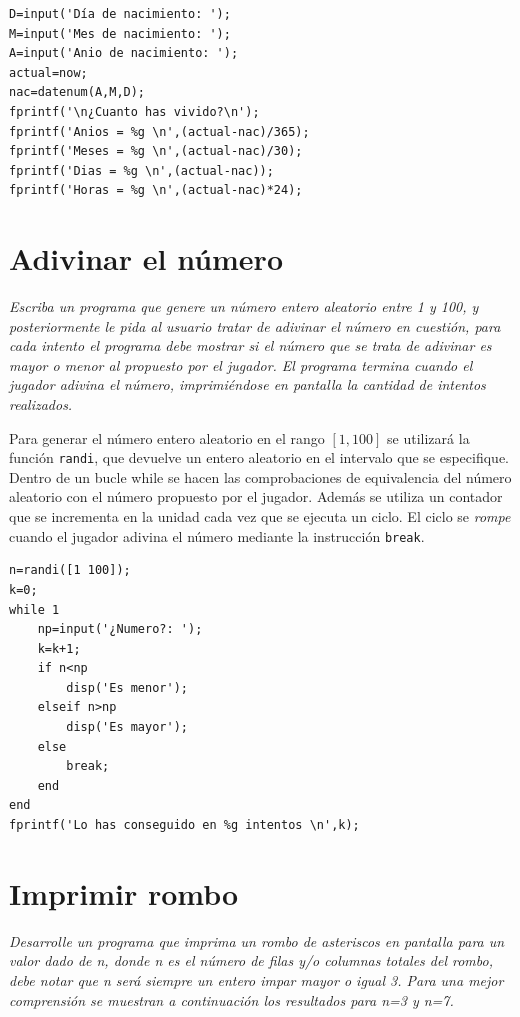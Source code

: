 \begin{verbatim}
D=input('Día de nacimiento: ');
M=input('Mes de nacimiento: ');
A=input('Anio de nacimiento: ');
actual=now;
nac=datenum(A,M,D);
fprintf('\n¿Cuanto has vivido?\n');
fprintf('Anios = %g \n',(actual-nac)/365);
fprintf('Meses = %g \n',(actual-nac)/30);
fprintf('Dias = %g \n',(actual-nac));
fprintf('Horas = %g \n',(actual-nac)*24);
\end{verbatim}


\section{Adivinar el número}

\textit{Escriba un programa que genere un número entero aleatorio entre 1 y 100, y posteriormente le pida al usuario tratar de adivinar el número en cuestión, para cada intento el programa debe mostrar si el número que se trata de adivinar es mayor o menor al propuesto por el jugador. El programa termina cuando el jugador adivina el número, imprimiéndose en pantalla la cantidad de intentos realizados.}



Para generar el número entero aleatorio en el rango $[1,100]$ se utilizará la función \texttt{randi}, que devuelve un 
entero aleatorio en el intervalo que se especifique. Dentro de un bucle while se hacen las comprobaciones de equivalencia 
del número aleatorio con el número propuesto por el jugador. Además se utiliza un contador que se incrementa en la unidad 
cada vez que se ejecuta un ciclo. El ciclo se \textit{rompe} cuando el jugador adivina el número mediante la 
instrucción \texttt{break}.

\begin{verbatim}
n=randi([1 100]);
k=0;
while 1
    np=input('¿Numero?: ');
    k=k+1;
    if n<np
        disp('Es menor');
    elseif n>np
        disp('Es mayor');
    else
        break;
    end
end
fprintf('Lo has conseguido en %g intentos \n',k);
\end{verbatim}

\section{Imprimir rombo} 

\textit{Desarrolle un programa que imprima un rombo de asteriscos en pantalla para un valor 
dado de n, donde n es el número de filas y/o columnas totales del rombo, debe notar que n será 
siempre un entero impar mayor o igual 3. Para una mejor comprensión se muestran a continuación 
los resultados para n=3 y n=7.}

